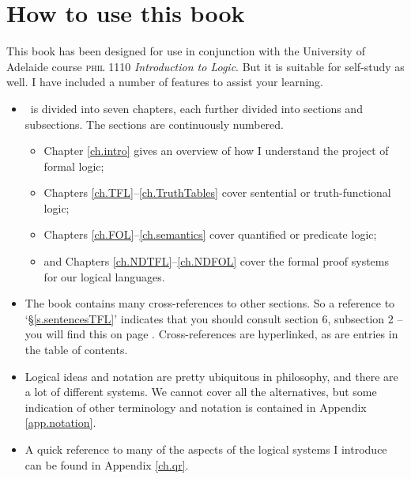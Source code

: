 \documentclass[twoside, openany, 11pt, a4paper]{memoir}
\begin{document}
\renewcommand{\partname}{Chapter} %

\pagestyle{forallxpage}


\frontmatter


\newpage
\tableofcontents*

\chapter*{How to use this book}

This book has been designed for use in conjunction with the University of Adelaide course \textsc{phil} 1110 \emph{Introduction to Logic}. But it is suitable for self-study as well. I have included a number of features to assist your learning. \begin{itemize}
	\item \forallx\ is divided into seven chapters, each further divided into sections and subsections. The sections are continuously numbered. \begin{itemize}
		\item Chapter \ref{ch.intro} gives an overview of how I understand the project of formal logic;
		\item Chapters \ref{ch.TFL}–\ref{ch.TruthTables} cover sentential or truth-functional logic;
		\item Chapters \ref{ch.FOL}–\ref{ch.semantics} cover quantified or predicate logic;
		\item and Chapters \ref{ch.NDTFL}–\ref{ch.NDFOL} cover the formal proof systems for our logical languages.
	\end{itemize}
	\item The book contains many cross-references to other sections. So a reference to `§\ref{s.sentencesTFL}' indicates that you should consult section 6, subsection 2 – you will find this on page \pageref{s.sentencesTFL}. Cross-references are hyperlinked, as are entries in the table of contents.
	\item Logical ideas and notation are pretty ubiquitous in philosophy, and there are a lot of different systems. We cannot cover all the alternatives, but some indication of other terminology and notation is contained in Appendix \ref{app.notation}.
	\item A quick reference to many of the aspects of the logical systems I introduce can be found in Appendix \ref{ch.qr}.

\end{itemize}
\end{document}

